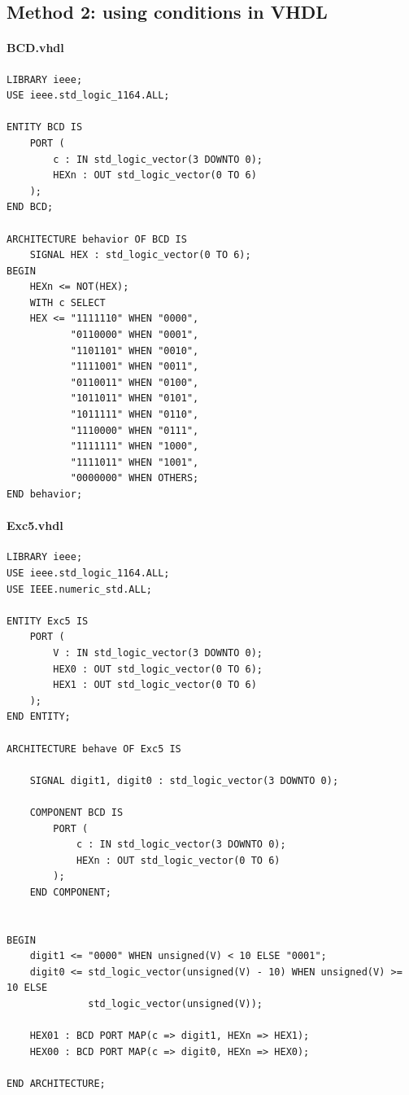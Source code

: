 \documentclass[13pt,a4paper]{report}
\begin{document}
\subsection{Method 2: using conditions in VHDL}
\paragraph{BCD.vhdl}
\begin{verbatim}
LIBRARY ieee;
USE ieee.std_logic_1164.ALL;

ENTITY BCD IS
	PORT (
		c : IN std_logic_vector(3 DOWNTO 0);
		HEXn : OUT std_logic_vector(0 TO 6)
	);
END BCD;

ARCHITECTURE behavior OF BCD IS
	SIGNAL HEX : std_logic_vector(0 TO 6);
BEGIN
	HEXn <= NOT(HEX);
	WITH c SELECT
	HEX <= "1111110" WHEN "0000", 
	       "0110000" WHEN "0001", 
	       "1101101" WHEN "0010", 
	       "1111001" WHEN "0011", 
	       "0110011" WHEN "0100", 
	       "1011011" WHEN "0101", 
	       "1011111" WHEN "0110", 
	       "1110000" WHEN "0111", 
	       "1111111" WHEN "1000", 
	       "1111011" WHEN "1001", 
	       "0000000" WHEN OTHERS;
END behavior;
\end{verbatim}

\paragraph{Exc5.vhdl}
\begin{verbatim}
LIBRARY ieee;
USE ieee.std_logic_1164.ALL;
USE IEEE.numeric_std.ALL;

ENTITY Exc5 IS
	PORT (
		V : IN std_logic_vector(3 DOWNTO 0);
		HEX0 : OUT std_logic_vector(0 TO 6);
		HEX1 : OUT std_logic_vector(0 TO 6)
	);
END ENTITY;

ARCHITECTURE behave OF Exc5 IS

	SIGNAL digit1, digit0 : std_logic_vector(3 DOWNTO 0);
 
	COMPONENT BCD IS
		PORT (
			c : IN std_logic_vector(3 DOWNTO 0);
			HEXn : OUT std_logic_vector(0 TO 6)
		);
	END COMPONENT;
 

BEGIN
	digit1 <= "0000" WHEN unsigned(V) < 10 ELSE "0001";
	digit0 <= std_logic_vector(unsigned(V) - 10) WHEN unsigned(V) >= 10 ELSE
	          std_logic_vector(unsigned(V));

	HEX01 : BCD PORT MAP(c => digit1, HEXn => HEX1);
	HEX00 : BCD PORT MAP(c => digit0, HEXn => HEX0);
 
END ARCHITECTURE;
\end{verbatim}
\end{document}
